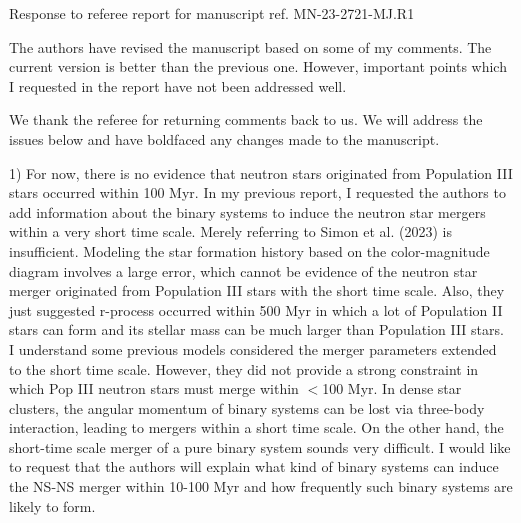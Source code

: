 \documentclass[11pt]{article}
\begin{document}
\begin{center} 
\bfseries{
\begin{large}
  Response to referee report for manuscript ref. MN-23-2721-MJ.R1
\end{large}
}
\end{center}

\begin{tcolorbox}[colback={lightgray}]
The authors have revised the manuscript based on some of my comments. The current version is better than the previous one. However, important points which I requested in the report have not been addressed well.
\end{tcolorbox}

We thank the referee for returning comments back to us. We will address the issues below and have boldfaced any changes made to the manuscript.

\begin{tcolorbox}[colback={lightgray}]
1) For now, there is no evidence that neutron stars originated from Population III stars occurred within 100 Myr. In my previous report, I requested the authors to add information about the binary systems to induce the neutron star mergers within a very short time scale. Merely referring to Simon et al. (2023) is insufficient. Modeling the star formation history based on the color-magnitude diagram involves a large error, which cannot be evidence of the neutron star merger originated from Population III stars with the short time scale. Also, they just suggested r-process occurred within 500 Myr in which a lot of Population II stars can form and its stellar mass can be much larger than Population III stars. I understand some previous models considered the merger parameters extended to the short time scale. However, they did not provide a strong constraint in which Pop III neutron stars must merge within $<$100 Myr. In dense star clusters, the angular momentum of binary systems can be lost via three-body interaction, leading to mergers within a short time scale. On the other hand, the short-time scale merger of a pure binary system sounds very difficult. I would like to request that the authors will explain what kind of binary systems can induce the NS-NS merger within 10-100 Myr and how frequently such binary systems are likely to form.
\end{tcolorbox}
\end{document}
